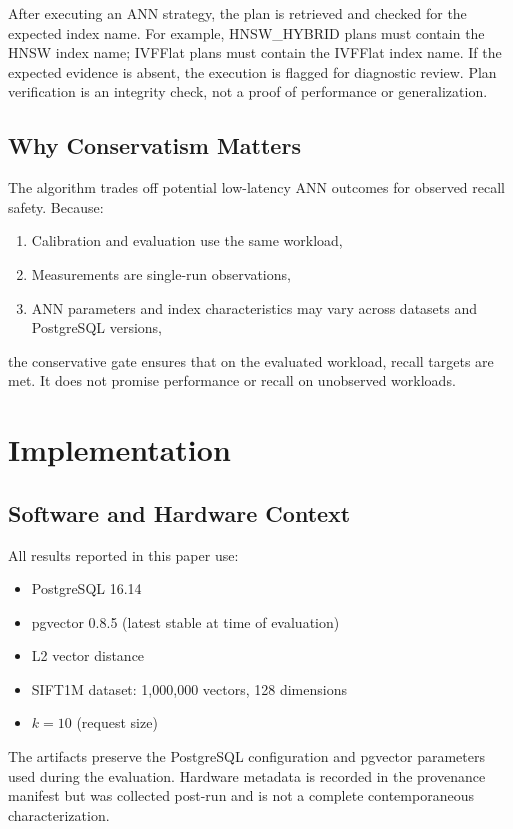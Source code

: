 \documentclass[10pt,twocolumn]{article}
\begin{document}
After executing an ANN strategy, the plan is retrieved and checked for the expected index name. For example, HNSW\_HYBRID plans must contain the HNSW index name; IVFFlat plans must contain the IVFFlat index name. If the expected evidence is absent, the execution is flagged for diagnostic review. Plan verification is an integrity check, not a proof of performance or generalization.

\subsection{Why Conservatism Matters}

The algorithm trades off potential low-latency ANN outcomes for observed recall safety. Because:

\begin{enumerate}
\item Calibration and evaluation use the same workload,
\item Measurements are single-run observations,
\item ANN parameters and index characteristics may vary across datasets and PostgreSQL versions,
\end{enumerate}

the conservative gate ensures that on the evaluated workload, recall targets are met. It does not promise performance or recall on unobserved workloads.

\section{Implementation}
\label{sec:implementation}

\subsection{Software and Hardware Context}

All results reported in this paper use:
\begin{itemize}
\item PostgreSQL 16.14
\item pgvector 0.8.5 (latest stable at time of evaluation)
\item L2 vector distance
\item SIFT1M dataset: 1,000,000 vectors, 128 dimensions
\item $k = 10$ (request size)
\end{itemize}

The artifacts preserve the PostgreSQL configuration and pgvector parameters used during the evaluation. Hardware metadata is recorded in the provenance manifest but was collected post-run and is not a complete contemporaneous characterization.
\end{document}

